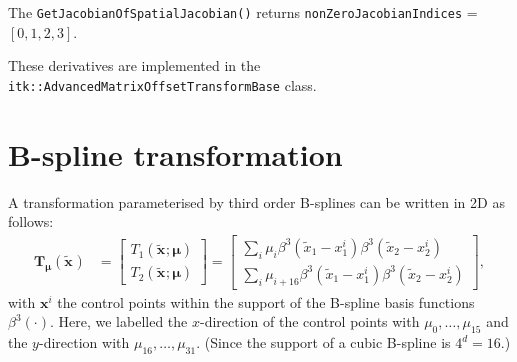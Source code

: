 \documentclass[]{article}
\newcommand{\vmu}{\bm{\mu}}
\newcommand{\vTmu}{\bm{T_{\mu}}}
\newcommand{\vx}[1][]{\bm{x}_{#1}}
\newcommand{\vxt}[1][]{\bm{\widetilde x}_{#1}}
\begin{document}

The \texttt{GetJacobianOfSpatialJacobian()} returns
\texttt{nonZeroJacobianIndices} = $[ 0, 1, 2, 3 ]$.


These derivatives are implemented in the
\texttt{itk::AdvancedMatrixOffsetTransformBase} class.

\section{B-spline transformation}

A transformation parameterised by third order B-splines can be
written in 2D as follows:
\begin{align}
\vTmu(\vxt) &= \begin{bmatrix} T_1(\vxt;\vmu) \\ T_2(\vxt;\vmu)
\end{bmatrix} = \begin{bmatrix} \sum_{i} \mu_i \beta^3(\widetilde{x}_1 - x_{1}^i)
\beta^3(\widetilde{x}_2 - x_{2}^i) \\ \sum_{i} \mu_{i+16}
\beta^3(\widetilde{x}_1 - x_{1}^i) \beta^3(\widetilde{x}_2 -
x_{2}^i)
\end{bmatrix},
\end{align}
with $\vx^i$ the control points within the support of the B-spline
basis functions $\beta^3(\cdot)$. Here, we labelled the
$x$-direction of the control points with $\mu_0, \ldots, \mu_{15}$
and the $y$-direction with $\mu_{16}, \ldots, \mu_{31}$. (Since the
support of a cubic B-spline is $4^d = 16$.)
\end{document}
